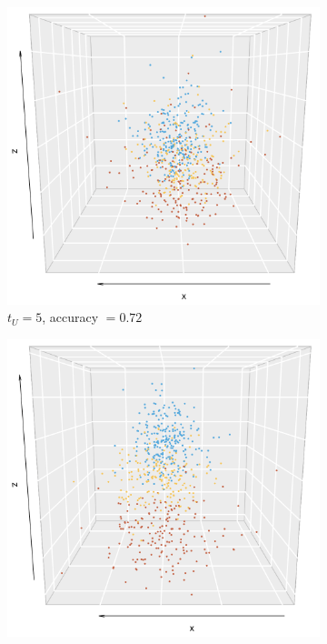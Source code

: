 \documentclass[10pt,journal,compsoc]{IEEEtran}
\numberwithin{equation}{section}
\begin{document}
\begin{figure}
\centering
\begin{subfigure}{.24\columnwidth}
\includegraphics[width=\columnwidth]{svd_5_d}%
\caption{$t_U = 5$, accuracy $=0.72$}
\end{subfigure}
\begin{subfigure}{.24\columnwidth}
\includegraphics[width=\columnwidth]{svd_6_d}%

\end{subfigure}
\end{figure}
\end{document}
